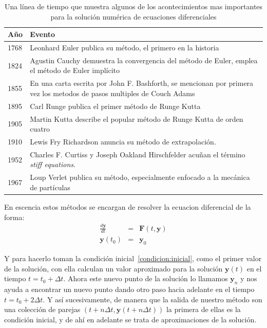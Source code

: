 \begin{table}
\begin{center}
\begin{tabular} {@{}lp{12cm}@{}} 
\toprule
Año & Evento \\ 
\midrule
1768 & Leonhard Euler publica su método, el primero en la historia \\
1824 & Agustin Cauchy demuestra la convergencia del método de Euler, emplea el método de Euler implícito \\
1855 & En una carta escrita por John F. Bashforth, se mencionan por primera vez los metodos de pasos multiples de Couch Adams \\
1895 & Carl Runge publica el primer método de Runge Kutta \\ 
1905 & Martin Kutta describe el popular método de Runge Kutta de orden cuatro \\ 
1910 & Lewis Fry Richardson anuncia su método de extrapolación. \\
1952 & Charles F. Curtiss y Joseph Oakland Hirschfelder acuñan el término \emph{\foreignlanguage{english}{stiff equations}}. \\
1967 & Loup Verlet publica su método, especialmente enfocado a la mecánica de partículas \\ 
\bottomrule
\end{tabular}
\end{center}
\caption[Evolución histórica de los métodos numéricos]{Una línea de tiempo que muestra algunos de los acontecimientos mas importantes para la solución numérica de ecuaciones diferenciales}
\label{historia:metodos}
\end{table}

En escencia estos métodos se encargan de resolver la ecuacion diferencial de la forma:
\begin{eqnarray}
 \frac{d\textbf{y}}{dt} & = &\textbf{F}(t,\textbf{y}) \nonumber \\
 \textbf{y}(t_0) & = & \textbf{y}_0 \label{condicion:inicial}
\end{eqnarray}

Y para hacerlo toman la condición inicial~\eqref{condicion:inicial}, como el primer valor de la solución, con ella calculan un valor aproximado para la solución $\textbf{y}(t)$ en el tiempo $t = t_0 + \Delta t$.
Ahora este nuevo punto de la solución lo llamamos $\textbf{y}_{n}$ y nos ayuda a encontrar un nuevo punto dando otro paso hacia adelante en el tiempo $t = t_0 + 2\Delta t$.
Y así sucesivamente, de manera que la salida de nuestro método son una colección de parejas $(t + n \Delta t, \textbf{y}(t + n \Delta t) )$ la primera de ellas es la condición inicial, y de ahí en adelante se trata de aproximaciones de la solución.

